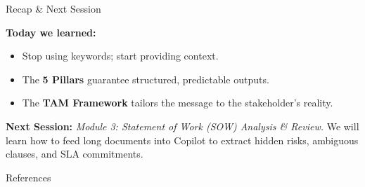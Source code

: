 \documentclass[aspectratio=169]{beamer}
\begin{document}
\begin{frame}[fragile]{Recap \& Next Session}


\textbf{Today we learned:}
\begin{itemize}
  \item Stop using keywords; start providing context.
  \item The \textbf{5 Pillars} guarantee structured, predictable outputs.
  \item The \textbf{TAM Framework} tailors the message to the stakeholder's reality.
\end{itemize}
\textbf{Next Session:}
\textit{Module 3: Statement of Work (SOW) Analysis \& Review.} We will learn how to feed long documents into Copilot to extract hidden risks, ambiguous clauses, and SLA commitments.
\end{frame}




\begin{frame}[allowframebreaks]{References}
  
  
\end{frame}
\end{document}
